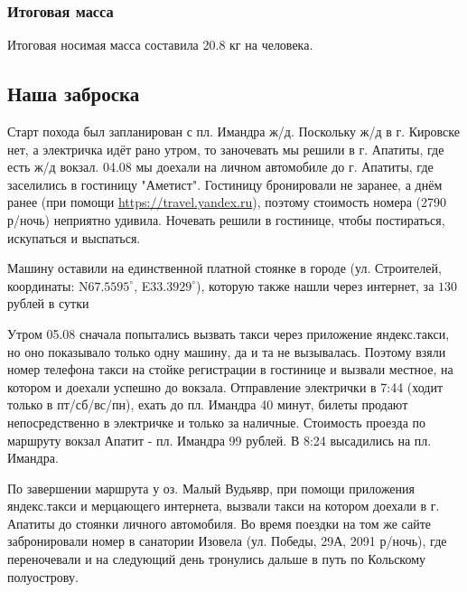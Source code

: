 \subsubsection{Итоговая масса}
Итоговая носимая масса составила 20.8 кг на человека.

\subsection{Наша заброска}
Старт похода был запланирован с пл. Имандра ж/д. Поскольку ж/д в г. Кировске нет, а электричка идёт рано утром,
то заночевать мы решили в г. Апатиты, где есть ж/д вокзал. 04.08 мы доехали на личном автомобиле до г. Апатиты,
где заселились в гостиницу "Аметист". Гостиницу бронировали не заранее, а днём ранее
(при помощи \url{https://travel.yandex.ru}), поэтому стоимость номера (2790 р/ночь) неприятно удивила.
Ночевать решили в гостинице, чтобы постираться, искупаться и выспаться.

Машину оставили на единственной платной стоянке в городе (ул. Строителей, координаты:
N$67.5595^{\circ}$, E$33.3929^{\circ}$),
которую также нашли через интернет, за $130$ рублей в сутки

Утром 05.08 сначала попытались вызвать такси через приложение яндекс.такси, но оно показывало только одну машину,
да и та не вызывалась. Поэтому взяли номер телефона такси на стойке регистрации в гостинице и вызвали местное,
на котором и доехали успешно до вокзала. Отправление электрички в 7:44 (ходит только в пт/сб/вс/пн),
ехать до пл. Имандра 40 минут, билеты продают непосредственно в электричке и только за наличные.
Стоимость проезда по маршруту вокзал Апатит - пл. Имандра 99 рублей. В 8:24 высадились на пл. Имандра.

По завершении маршрута у оз. Малый Вудьявр, при помощи приложения яндекс.такси и мерцающего интернета,
вызвали такси на котором доехали в г. Апатиты до стоянки личного автомобиля.
Во время поездки на том же сайте забронировали номер в санатории Изовела (ул. Победы, 29А, 2091 р/ночь),
где переночевали и на следующий день тронулись дальше в путь по Кольскому полуострову.
